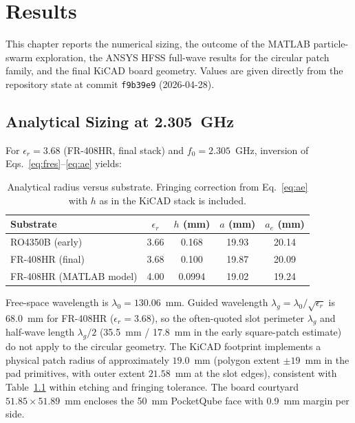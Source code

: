 %
%
%
%

\chapter{Results}

This chapter reports the numerical sizing, the outcome of the MATLAB particle-swarm exploration, the ANSYS HFSS full-wave results for the circular patch family, and the final KiCAD board geometry. Values are given directly from the repository state at commit \texttt{f9b39e9} (2026-04-28).

\section{Analytical Sizing at 2.305~GHz}

For $\epsilon_r = 3.68$ (FR-408HR, final stack) and $f_0 = 2.305$~GHz, inversion of Eqs.~\ref{eq:fres}--\ref{eq:ae} yields:

\begin{table}[H]
\centering
\caption{Analytical radius versus substrate. Fringing correction from Eq.~\ref{eq:ae} with $h$ as in the KiCAD stack is included.}
\label{tab:radius}
\begin{tabular}{l c c c c}
\toprule
Substrate & $\epsilon_r$ & $h$ (mm) & $a$ (mm) & $a_e$ (mm) \\
\midrule
RO4350B (early) & 3.66 & 0.168 & 19.93 & 20.14 \\
FR-408HR (final) & 3.68 & 0.100 & 19.87 & 20.09 \\
FR-408HR (MATLAB model) & 4.00 & 0.0994 & 19.02 & 19.24 \\
\bottomrule
\end{tabular}
\end{table}

Free-space wavelength is $\lambda_0 = 130.06$~mm. Guided wavelength $\lambda_g = \lambda_0/\sqrt{\epsilon_r}$ is $68.0$~mm for FR-408HR ($\epsilon_r=3.68$), so the often-quoted slot perimeter $\lambda_g$ and half-wave length $\lambda_g/2$ (35.5~mm / 17.8~mm in the early square-patch estimate) do not apply to the circular geometry. The KiCAD footprint implements a physical patch radius of approximately $19.0$~mm (polygon extent $\pm 19$~mm in the pad primitives, with outer extent $21.58$~mm at the slot edges), consistent with Table~\ref{tab:radius} within etching and fringing tolerance. The board courtyard $51.85 \times 51.89$~mm encloses the 50~mm PocketQube face with 0.9~mm margin per side.

